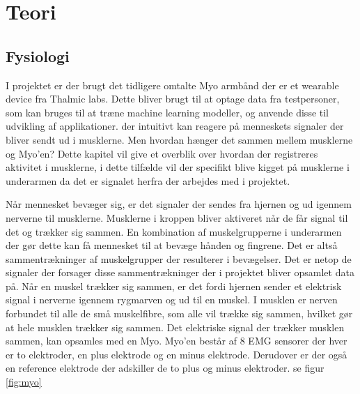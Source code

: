 \thispagestyle{fancy}
\chapter{Teori}
\label{chp:teori}

\section{Fysiologi}
\label{sec:fysiologi}
I projektet er der brugt det tidligere omtalte Myo armbånd der er et wearable device fra Thalmic labs. Dette bliver brugt til at optage data fra testpersoner, som kan bruges til at træne machine learning modeller, og anvende disse til udvikling af applikationer. der intuitivt kan reagere på menneskets signaler der bliver sendt ud i musklerne. Men hvordan hænger det sammen mellem musklerne og Myo'en? Dette kapitel vil give et overblik over hvordan der registreres aktivitet i musklerne, i dette tilfælde vil der specifikt blive kigget på musklerne i underarmen da det er signalet herfra der arbejdes med i projektet.

Når mennesket bevæger sig, er det signaler der sendes fra hjernen og ud igennem nerverne til musklerne. Musklerne i kroppen bliver aktiveret når de får signal til det og trækker sig sammen. En kombination af muskelgrupperne i underarmen der gør dette kan få mennesket til at bevæge hånden og fingrene. Det er altså sammentrækninger af muskelgrupper der resulterer i bevægelser. Det er netop de signaler der forsager disse sammentrækninger der i projektet bliver opsamlet data på. Når en muskel trækker sig sammen, er det fordi hjernen sender et elektrisk signal i nerverne igennem rygmarven og ud til en muskel. I musklen er nerven forbundet til alle de små muskelfibre, som alle vil trække sig sammen, hvilket gør at hele musklen trækker sig sammen. Det elektriske signal der trækker musklen sammen, kan opsamles med en Myo. Myo'en består af 8 EMG sensorer der hver er to elektroder, en plus elektrode og en minus elektrode. Derudover er der også en reference elektrode der adskiller de to plus og minus elektroder. se figur \ref{fig:myo}


